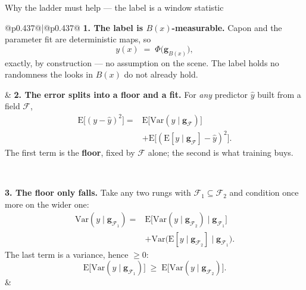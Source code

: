 \begin{frame}{Why the ladder must help --- the label is a window statistic}
  \setlength{\abovedisplayskip}{4pt}
  \setlength{\belowdisplayskip}{4pt}
  \small
  \setlength{\arrayrulewidth}{0.3pt}
  \vspace{12pt}
  \begin{tabular}{@{}p{}@{\hspace{15pt}}|@{\hspace{17pt}}p{}@{}}
    \textbf{1. The label is $B(x)$-measurable.} Capon and the parameter fit are
    deterministic maps, so
    \[
      y(x) \;=\; \Phi\big(\mathbf{g}_{B(x)}\big),
    \]
    exactly, by construction --- no assumption on the scene. The label holds no
    randomness the looks in $B(x)$ do not already hold.
    \rule[-16pt]{0pt}{0pt}%
    &
    \textbf{2. The error splits into a floor and a fit.} For \emph{any} predictor
    $\hat y$ built from a field $\mathcal{F}$,
    \[
      \begin{aligned}
        \mathrm{E}\big[(y - \hat y)^{2}\big] = {}
          & \mathrm{E}\big[\mathrm{Var}(y \mid \mathbf{g}_{\mathcal{F}})\big] \\[2pt]
          & + \mathrm{E}\big[(\mathrm{E}[y \mid \mathbf{g}_{\mathcal{F}}] - \hat y)^{2}\big].
      \end{aligned}
    \]
    The first term is the \textbf{floor}, fixed by $\mathcal{F}$ alone; the second is
    what training buys.
    \rule[-16pt]{0pt}{0pt}%
    \\
    \hline
    \rule{0pt}{24pt}%
    \textbf{3. The floor only falls.} Take any two rungs with $\mathcal{F}_{1}
    \subseteq \mathcal{F}_{2}$ and condition once more on the wider one:
    \[
      \begin{aligned}
        \mathrm{Var}(y \mid \mathbf{g}_{\mathcal{F}_1}) = {}
          & \mathrm{E}\big[\mathrm{Var}(y \mid \mathbf{g}_{\mathcal{F}_2}) \mid \mathbf{g}_{\mathcal{F}_1}\big] \\[2pt]
          & + \mathrm{Var}\big(\mathrm{E}[y \mid \mathbf{g}_{\mathcal{F}_2}] \mid \mathbf{g}_{\mathcal{F}_1}\big).
      \end{aligned}
    \]
    The last term is a variance, hence $\ge 0$:
    \[
      \mathrm{E}\big[\mathrm{Var}(y \mid \mathbf{g}_{\mathcal{F}_1})\big]
      \;\ge\;
      \mathrm{E}\big[\mathrm{Var}(y \mid \mathbf{g}_{\mathcal{F}_2})\big].
    \]
    &
    \rule{0pt}{24pt}%

\end{tabular}
\end{frame}
